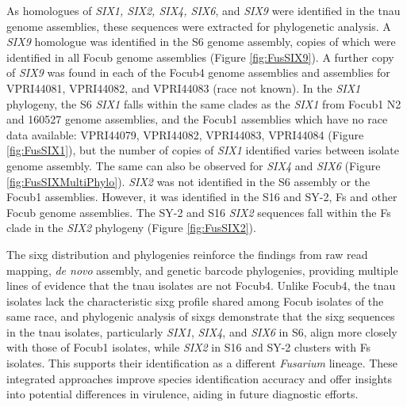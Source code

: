 As homologues of \textit{SIX1, SIX2, SIX4, SIX6}, and \textit{SIX9} were identified in the \ac{tnau} genome assemblies, these sequences were extracted for phylogenetic analysis.  A \textit{SIX9} homologue was identified in the S6 genome assembly, copies of which were identified in all \ac{Focub} genome assemblies (Figure \ref{fig:FusSIX9}). A further copy of \textit{SIX9} was found in each of the \ac{Focub4} genome assemblies and assemblies for VPRI44081, VPRI44082, and VPRI44083 (race not known). In the \textit{SIX1} phylogeny, the S6 \textit{SIX1} falls within the same clades as the \textit{SIX1} from \ac{Focub1} N2 and 160527 genome assemblies, and the \ac{Focub1} assemblies which have no race data available: VPRI44079, VPRI44082, VPRI44083, VPRI44084 (Figure \ref{fig:FusSIX1}), but the number of copies of \textit{SIX1} identified varies between isolate genome assembly. The same can also be observed for \textit{SIX4} and \textit{SIX6} (Figure \ref{fig:FusSIXMultiPhylo}). \textit{SIX2} was not identified in the S6 assembly or the \ac{Focub1} assemblies. However, it was identified in the S16 and SY-2, \ac{Fs} and other \ac{Focub} genome assemblies. The SY-2 and S16 \textit{SIX2} sequences fall within the \ac{Fs} clade in the \textit{SIX2} phylogeny (Figure \ref{fig:FusSIX2}).

The \ac{sixg} distribution and phylogenies reinforce the findings from raw read mapping, \textit{de novo} assembly, and genetic barcode phylogenies, providing multiple lines of evidence that the \ac{tnau} isolates are not \ac{Focub4}. Unlike \ac{Focub4}, the \ac{tnau} isolates lack the characteristic \ac{sixg} profile shared among \ac{Focub} isolates of the same race, and phylogenic analysis of \acp{sixg} demonstrate that the \ac{sixg} sequences in the \ac{tnau} isolates, particularly \textit{SIX1}, \textit{SIX4}, and \textit{SIX6} in S6, align more closely with those of \ac{Focub1} isolates, while \textit{SIX2} in S16 and SY-2 clusters with \ac{Fs} isolates. This supports their identification as a different \textit{Fusarium} lineage. These integrated approaches improve species identification accuracy and offer insights into potential differences in virulence, aiding in future diagnostic efforts.

